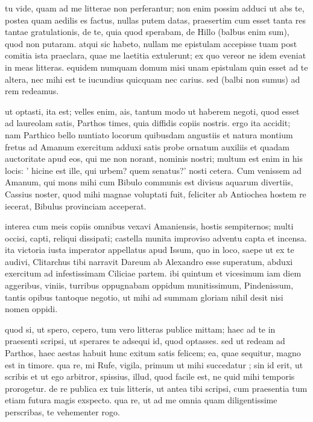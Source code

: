 


 tu vide, quam ad me litterae non perferantur; non enim possim adduci ut abs te, postea quam aedilis es factus, nullas putem datas, praesertim cum esset tanta res tantae gratulationis, de te, quia quod sperabam, de Hillo (balbus enim sum), quod non putaram. atqui sic habeto, nullam me epistulam accepisse tuam post comitia ista praeclara, quae me laetitia extulerunt; ex quo vereor ne idem eveniat in meas litteras. equidem numquam domum misi unam epistulam quin esset ad te altera, nec mihi est te iucundius quicquam nec carius. sed (balbi non sumus) ad rem redeamus.

 ut optasti, ita est; velles enim, ais, tantum modo ut haberem negoti, quod esset ad laureolam satis, Parthos times, quia diffidis copiis nostris. ergo ita accidit; nam Parthico bello nuntiato locorum quibusdam angustiis et natura montium fretus ad Amanum exercitum adduxi satis probe ornatum auxiliis et quadam auctoritate apud eos, qui me non norant, nominis nostri; multum est enim in his locis: ' hicine est ille, qui urbem? quem senatus?' nosti cetera. Cum venissem ad Amanum, qui mons mihi cum Bibulo communis est divisus aquarum divertiis, Cassius noster, quod mihi magnae voluptati fuit, feliciter ab Antiochea hostem re iecerat, Bibulus provinciam acceperat.

 interea cum meis copiis omnibus vexavi Amaniensis, hostis sempiternos; multi occisi, capti, reliqui dissipati; castella munita improviso adventu capta et incensa. ita victoria iusta imperator appellatus apud Issum, quo in loco, saepe ut ex te audivi, Clitarchus tibi narravit Dareum ab Alexandro esse superatum, abduxi exercitum ad infestissimam Ciliciae partem. ibi quintum et vicesimum iam diem aggeribus, viniis, turribus oppugnabam oppidum munitissimum, Pindenissum, tantis opibus tantoque negotio, ut mihi ad summam gloriam nihil desit nisi nomen oppidi.

 quod si, ut spero, cepero, tum vero litteras publice mittam; haec ad te in praesenti scripsi, ut sperares te adsequi id, quod optasses. sed ut redeam ad Parthos, haec aestas habuit hunc exitum satis felicem; ea, quae sequitur, magno est in timore. qua re, mi Rufe, vigila, primum ut mihi succedatur ; sin id erit, ut scribis et ut ego arbitror, spissius, illud, quod facile est, ne quid mihi temporis prorogetur. de re publica ex tuis litteris, ut antea tibi scripsi, cum praesentia tum etiam futura magis exspecto. qua re, ut ad me omnia quam diligentissime perscribas, te vehementer rogo.
